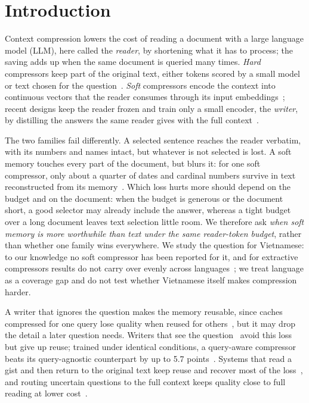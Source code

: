 \section{Introduction}
\label{sec:intro}

Context compression lowers the cost of reading a document with a large language model (LLM), here called the \emph{reader}, by shortening what it has to process; the saving adds up when the same document is queried many times.
\emph{Hard} compressors keep part of the original text, either tokens scored by a small model~\cite{jiang2023llmlingua,pan2024llmlingua2} or text chosen for the question~\cite{jiang2024longllmlingua}.
\emph{Soft} compressors encode the context into continuous vectors that the reader consumes through its input embeddings~\cite{mu2023gist,ge2024icae,cheng2024xrag,li2024_500x}; recent designs keep the reader frozen and train only a small encoder, the \emph{writer}, by distilling the answers the same reader gives with the full context~\cite{xu2026latentpress,liu2025sac,rahman2026cmc}.

The two families fail differently.
A selected sentence reaches the reader verbatim, with its numbers and names intact, but whatever is not selected is lost.
A soft memory touches every part of the document, but blurs it: for one soft compressor, only about a quarter of dates and cardinal numbers survive in text reconstructed from its memory~\cite{lajewska2025information}.
Which loss hurts more should depend on the budget and on the document: when the budget is generous or the document short, a good selector may already include the answer, whereas a tight budget over a long document leaves text selection little room.
We therefore ask \emph{when soft memory is more worthwhile than text under the same reader-token budget}, rather than whether one family wins everywhere.
We study the question for Vietnamese: to our knowledge no soft compressor has been reported for it, and for extractive compressors results do not carry over evenly across languages~\cite{lukauskas2026lost}; we treat language as a coverage gap and do not test whether Vietnamese itself makes compression harder.

A writer that ignores the question makes the memory reusable, since caches compressed for one query lose quality when reused for others~\cite{kim2025kvzip}, but it may drop the detail a later question needs.
Writers that see the question~\cite{cao2024qgc,louis2025oscar} avoid this loss but give up reuse; trained under identical conditions, a query-aware compressor beats its query-agnostic counterpart by up to 5.7 points~\cite{sakhno2026adamem}.
Systems that read a gist and then return to the original text keep reuse and recover most of the loss~\cite{lee2024readagent,xie2026lensvlm}, and routing uncertain questions to the full context keeps quality close to full reading at lower cost~\cite{li2024selfroute}.

